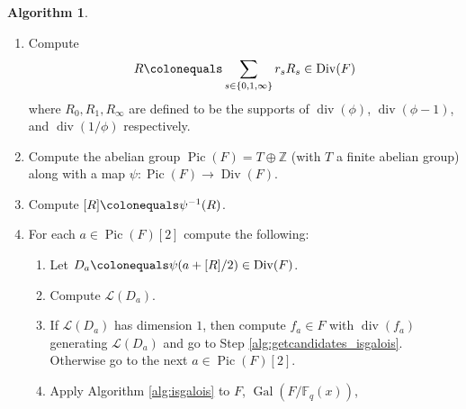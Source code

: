 \documentclass{dcthesis}
\newcommand{\ZZ}{\mathbb Z}
\newcommand{\wt}[1]{\widetilde{#1}}
\newcommand{\FF}{\mathbb{F}}
\DeclareMathOperator{\Div}{Div}
\DeclareMathOperator{\Pic}{Pic}
\DeclareMathOperator{\ddiv}{div}
\DeclareMathOperator{\order}{order}
\DeclareMathOperator{\Gal}{Gal}
\numberwithin{equation}{section}
\theoremstyle{definition}
\newtheorem{alg}[equation]{Algorithm}
\theoremstyle{remark}
\begin{document}
{{\begin{alg}
\begin{enumerate}
\begin{align}
            r_s\colonequals
            \begin{cases}
              0&
              \text{ if }
              \order(\sigma_s)=
              \order(\wt{\sigma}_s)\\
              1&
              \text{ if }
              \order(\sigma_s)<
              \order(\wt{\sigma}_s)\\
            \end{cases}
          \end{align}
        \item\label{alg:getcandidates_getram}
          Compute
          \begin{equation}
            \label{eqn:ramdivisor}
            R\colonequals
            \sum_{s\in\{0,1,\infty\}}r_sR_s
            \in\Div(F)
          \end{equation}
          where
          $R_0,R_1,R_\infty$
          are defined to be the supports
          of
          $\ddiv(\phi)$,
          $\ddiv(\phi-1)$,
          and $\ddiv(1/\phi)$
          respectively.
        \item\label{alg:getcandidates_Pic}
          Compute the abelian group
          $\Pic(F)=T\oplus\ZZ$
          (with $T$ a finite abelian group)
          along with a map
          $\psi\colon\Pic(F)\to\Div(F)$.
        \item\label{alg:getcandidates_PicR}
          Compute
          $[R]\colonequals\psi^{-1}(R)$.
        \item\label{alg:getcandidates_Pic2}
          For each $a\in\Pic(F)[2]$ compute the
          following:
          \begin{enumerate}
            \item\label{alg:getcandidates_Da}
              Let $D_a\colonequals\psi(a+[R]/2)
              \in\Div(F)$.
            \item\label{alg:getcandidates_LDa}
              Compute $\mathscr{L}(D_a)$.
            \item\label{alg:getcandidates_dimLDa}
              If $\mathscr{L}(D_a)$ has dimension
              $1$, then compute
              $f_a\in F$ with $\ddiv(f_a)$
              generating $\mathscr{L}(D_a)$
              and go to Step
              \ref{alg:getcandidates_isgalois}.
              Otherwise go to the next
              $a\in\Pic(F)[2]$.
            \item\label{alg:getcandidates_isgalois}
              Apply Algorithm \ref{alg:isgalois}
              to $F$,
              $\Gal(F/\FF_q(x))$,

\end{enumerate}
\end{enumerate}
\end{alg}}}
\end{document}
